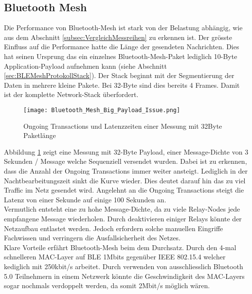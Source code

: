 
\subsection{Bluetooth Mesh}\label{subsec:Bluetooth_Mesh}

Die Performance von Bluetooth-Mesh ist stark von der Belastung abhängig, wie aus dem Abschnitt \ref{subsec:VergleichMessreihen} zu erkennen ist. Der grösste Einfluss auf die Performance hatte die Länge der gesendeten Nachrichten. Dies hat seinen Ursprung das ein einzelnes Bluetooth-Mesh-Paket lediglich 10-Byte Application-Payload aufnehmen kann (siehe Abschnitt \ref{sec:BLEMeshProtokollStack}). Der Stack beginnt mit der Segmentierung der Daten in mehrere kleine Pakete. Bei 32-Byte sind dies bereits 4 Frames. Damit ist der komplette Network-Stack überfordert. 

\begin{figure}[H]
	\centering
	\texttt{[image: Bluetooth\_Mesh\_Big\_Payload\_Issue.png]}
	\caption{Ongoing Transactions und Latenzzeiten einer Messung mit 32Byte Paketlänge}\label{fig:Bluetooth_Mesh_Big_Payload_Issue}
\end{figure}

Abbildung \ref{fig:Bluetooth_Mesh_Big_Payload_Issue} zeigt eine Messung mit 32-Byte Payload, einer Message-Dichte von 3 Sekunden / Message welche Sequenziell versendet wurden. Dabei ist zu erkennen, dass die Anzahl der Ongoing Transactions immer weiter ansteigt. Lediglich in der Nachtbearbeitungszeit sinkt die Kurve wieder. Dies deutet darauf hin das zu viel Traffic im Netz gesendet wird. Angelehnt an die Ongoing Transactions steigt die Latenz von einer Sekunde auf einige 100 Sekunden an. \\

Vermutlich entsteht eine zu hohe Message-Dichte, da zu viele Relay-Nodes jede empfangene Message wiederholen. Durch deaktivieren einiger Relays könnte der Netzaufbau entlastet werden. Jedoch erfordern solche manuellen Eingriffe Fachwissen und verringern die Ausfallsicherheit des Netzes. \\

Klare Vorteile erfährt Bluetooth-Mesh beim dem Durchsatz. Durch den 4-mal schnelleren MAC-Layer auf BLE 1Mbits gegenüber IEEE 802.15.4 welcher kediglich mit 250kbit/s arbeitet. Durch verwenden von ausschliesslich Bluetooth 5.0 Teilnehmern in einem Netzwerk könnte die Geschwindigkeit des MAC-Layers sogar nochmals verdoppelt werden, da somit 2Mbit/s möglich wären. \\ 












